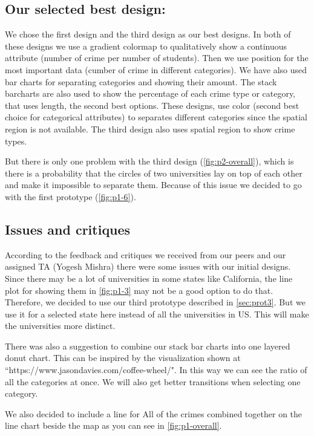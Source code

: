 \documentclass[12pt]{article}
\begin{document}
\subsection{Our selected best design:}

We chose the first design and the third design as our best designs. In both of these designs we use a gradient colormap to qualitatively show a continuous attribute (number of crime per number of students). Then we use position for the most important data (cumber of crime in different categories). We have also used bar charts for separating categories and showing their amount. The stack barcharts are also used to show the percentage of each crime type or category, that uses length, the second best options. These designs, use color (second best choice for categorical attributes) to separates different categories since the spatial region is not available. The third design also uses spatial region to show crime types. 

But there is only one problem with the third design (\cref{fig:p2-overall}), which is there is a probability that the circles of two universities lay on top of each other and make it impossible to separate them. Because of this issue we decided to go with the first prototype (\cref{fig:p1-6}).

\subsection{Issues and critiques}
According to the feedback and critiques we received from our peers and our assigned TA (Yogesh Mishra) there were some issues with our initial designs. Since there may be a lot of  universities in some states like California, the line plot for showing them in \cref{fig:p1-3} may not be a good option to do that. Therefore, we decided to use our third prototype described in \cref{sec:prot3}. But we use it for a selected state here instead of all the universities in US. This will make the universities more distinct.

There was also a suggestion to combine our stack bar charts into one layered donut chart. This can be inspired by the visualization shown at ``https://www.jasondavies.com/coffee-wheel/". In this way we can see the ratio of all the categories at once. We will also get better transitions when selecting one category.  

We also decided to include a line for All of the crimes combined together on the line chart beside the map as you can see in \cref{fig:p1-overall}.
\end{document}
